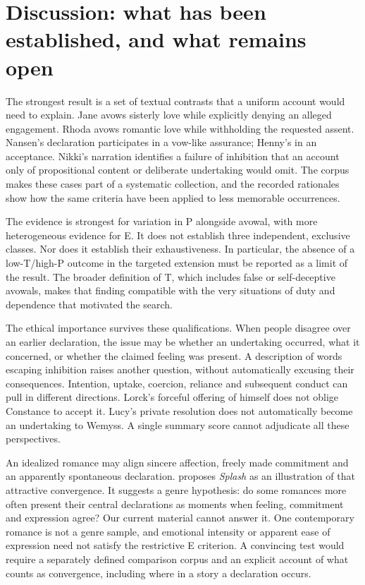 \documentclass[11pt,a4paper]{article}
\begin{document}
\section{Discussion: what has been established, and what remains open}

The strongest result is a set of textual contrasts that a uniform account would need to explain. Jane avows sisterly love while explicitly denying an alleged engagement. Rhoda avows romantic love while withholding the requested assent. Nansen's declaration participates in a vow-like assurance; Henny's in an acceptance. Nikki's narration identifies a failure of inhibition that an account only of propositional content or deliberate undertaking would omit. The corpus makes these cases part of a systematic collection, and the recorded rationales show how the same criteria have been applied to less memorable occurrences.

The evidence is strongest for variation in P alongside avowal, with more heterogeneous evidence for E. It does not establish three independent, exclusive classes. Nor does it establish their exhaustiveness. In particular, the absence of a low-T/high-P outcome in the targeted extension must be reported as a limit of the result. The broader definition of T, which includes false or self-deceptive avowals, makes that finding compatible with the very situations of duty and dependence that motivated the search.

The ethical importance survives these qualifications. When people disagree over an earlier declaration, the issue may be whether an undertaking occurred, what it concerned, or whether the claimed feeling was present. A description of words escaping inhibition raises another question, without automatically excusing their consequences. Intention, uptake, coercion, reliance and subsequent conduct can pull in different directions. Lorck's forceful offering of himself does not oblige Constance to accept it. Lucy's private resolution does not automatically become an undertaking to Wemyss. A single summary score cannot adjudicate all these perspectives.

An idealized romance may align sincere affection, freely made commitment and an apparently spontaneous declaration. \citet{rayner2014} proposes \emph{Splash} as an illustration of that attractive convergence. It suggests a genre hypothesis: do some romances more often present their central declarations as moments when feeling, commitment and expression agree? Our current material cannot answer it. One contemporary romance is not a genre sample, and emotional intensity or apparent ease of expression need not satisfy the restrictive E criterion. A convincing test would require a separately defined comparison corpus and an explicit account of what counts as convergence, including where in a story a declaration occurs.
\end{document}
